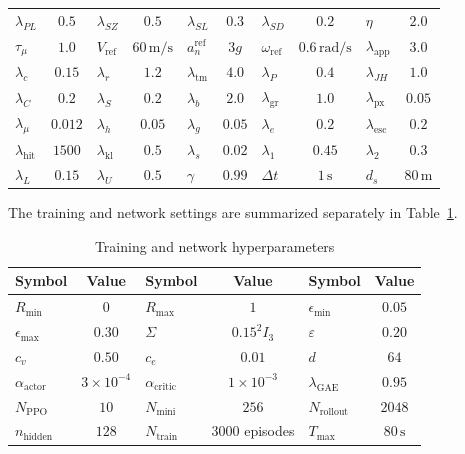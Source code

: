 \documentclass{cja}
\begin{document}
\begin{table}[!t]
{\begin{tabular}{@{}lc|lc|lc|lc|lc@{}}
$\lambda_{PL}$ & $0.5$ & $\lambda_{SZ}$ & $0.5$ & $\lambda_{SL}$ & $0.3$ & $\lambda_{SD}$ & $0.2$ & $\eta$ & $2.0$ \\
$\tau_{\mu}$ & $1.0$ & $V_{\mathrm{ref}}$ & $60\,\mathrm{m/s}$ & $a_n^{\mathrm{ref}}$ & $3g$ & $\omega_{\mathrm{ref}}$ & $0.6\,\mathrm{rad/s}$ & $\lambda_{\mathrm{app}}$ & $3.0$ \\
$\lambda_c$ & $0.15$ & $\lambda_r$ & $1.2$ & $\lambda_{\mathrm{tm}}$ & $4.0$ & $\lambda_P$ & $0.4$ & $\lambda_{JH}$ & $1.0$ \\
$\lambda_C$ & $0.2$ & $\lambda_S$ & $0.2$ & $\lambda_b$ & $2.0$ & $\lambda_{\mathrm{gr}}$ & $1.0$ & $\lambda_{\mathrm{px}}$ & $0.05$ \\
$\lambda_{\mu}$ & $0.012$ & $\lambda_h$ & $0.05$ & $\lambda_g$ & $0.05$ & $\lambda_e$ & $0.2$ & $\lambda_{\mathrm{esc}}$ & $0.2$ \\
$\lambda_{\mathrm{hit}}$ & $1500$ & $\lambda_{\mathrm{kl}}$ & $0.5$ & $\lambda_s$ & $0.02$ & $\lambda_1$ & $0.45$ & $\lambda_2$ & $0.3$ \\
$\lambda_L$ & $0.15$ & $\lambda_U$ & $0.5$ & $\gamma$ & $0.99$ & $\Delta t$ & $1\,\mathrm{s}$ & $d_s$ & $80\,\mathrm{m}$ \\
\bottomrule
\end{tabular}%
}
\end{table}

The training and network settings are summarized separately in Table~\ref{tab:training-hyperparameters}.
\begin{table}[!t]
\centering
\scriptsize
\setlength{\tabcolsep}{5pt}
\renewcommand{\arraystretch}{1.08}
\caption{Training and network hyperparameters}
\label{tab:training-hyperparameters}
\begin{tabular}{@{}lc|lc|lc@{}}
\toprule
Symbol & Value & Symbol & Value & Symbol & Value \\
\midrule
$R_{\min}$ & $0$ & $R_{\max}$ & $1$ & $\epsilon_{\min}$ & $0.05$ \\
$\epsilon_{\max}$ & $0.30$ & $\Sigma$ & $0.15^2 I_3$ & $\varepsilon$ & $0.20$ \\
$c_v$ & $0.50$ & $c_e$ & $0.01$ & $d$ & $64$ \\
$\alpha_{\mathrm{actor}}$ & $3{\times}10^{-4}$ & $\alpha_{\mathrm{critic}}$ & $1{\times}10^{-3}$ & $\lambda_{\mathrm{GAE}}$ & $0.95$ \\
$N_{\mathrm{PPO}}$ & $10$ & $N_{\mathrm{mini}}$ & $256$ & $N_{\mathrm{rollout}}$ & $2048$ \\
$n_{\mathrm{hidden}}$ & $128$ & $N_{\mathrm{train}}$ & $3000$ episodes & $T_{\max}$ & $80\,\mathrm{s}$ \\
\bottomrule
\end{tabular}
\end{table}
\end{document}
